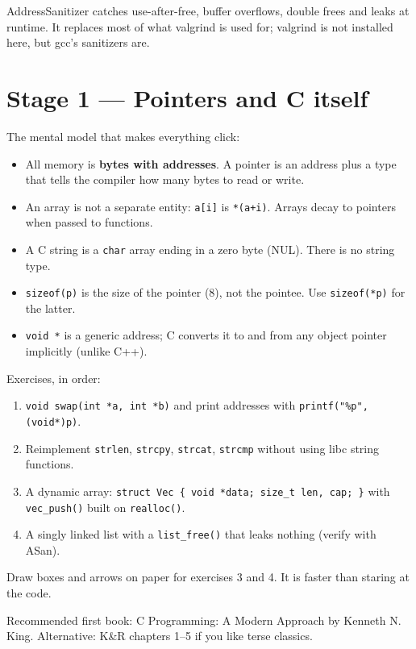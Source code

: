 \documentclass[11pt]{article}
\begin{document}
AddressSanitizer catches use-after-free, buffer overflows, double frees and
leaks at runtime. It replaces most of what valgrind is used for; valgrind is
not installed here, but gcc's sanitizers are.

\section{Stage 1 --- Pointers and C itself}

The mental model that makes everything click:

\begin{itemize}
  \item All memory is \textbf{bytes with addresses}. A pointer is an address
        plus a type that tells the compiler how many bytes to read or write.
  \item An array is not a separate entity: \texttt{a[i]} is \texttt{*(a+i)}.
        Arrays decay to pointers when passed to functions.
  \item A C string is a \texttt{char} array ending in a zero byte (NUL).
        There is no string type.
  \item \texttt{sizeof(p)} is the size of the pointer (8), not the pointee.
        Use \texttt{sizeof(*p)} for the latter.
  \item \texttt{void *} is a generic address; C converts it to and from any
        object pointer implicitly (unlike C++).
\end{itemize}

Exercises, in order:

\begin{enumerate}
  \item \texttt{void swap(int *a, int *b)} and print addresses with
        \texttt{printf("\%p", (void*)p)}.
  \item Reimplement \texttt{strlen}, \texttt{strcpy}, \texttt{strcat},
        \texttt{strcmp} without using libc string functions.
  \item A dynamic array: \verb|struct Vec { void *data; size_t len, cap; }|
        with \verb|vec_push()| built on \texttt{realloc()}.
  \item A singly linked list with a \verb|list_free()| that leaks nothing
        (verify with ASan).
\end{enumerate}

Draw boxes and arrows on paper for exercises 3 and 4. It is faster than
staring at the code.

Recommended first book: C Programming: A Modern Approach by Kenneth N. King.
Alternative: K\&R chapters 1--5 if you like terse classics.
\end{document}
